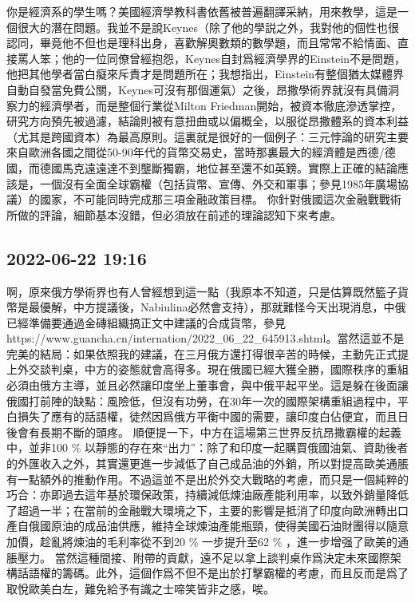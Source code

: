 \documentclass[twocolumn]{ctexart}
\begin{document}
你是經濟系的學生嗎？美國經濟學教科書依舊被普遍翻譯采納，用來教學，這是一個很大的潛在問題。我並不是說Keynes（除了他的學説之外，我對他的個性也很認同，畢竟他不但也是理科出身，喜歡解奧數類的數學題，而且常常不給情面、直接罵人笨；他的一位同僚曾經抱怨，Keynes自封爲經濟學界的Einstein不是問題，他把其他學者當白癡來斥責才是問題所在；我想指出，Einstein有整個猶太媒體界自動自發當免費公關，Keynes可沒有那個運氣）之後，昂撒學術界就沒有具備洞察力的經濟學者，而是整個行業從Milton Friedman開始，被資本徹底滲透掌控，研究方向預先被過濾，結論則被有意扭曲或以偏概全，以服從昂撒體系的資本利益（尤其是跨國資本）為最高原則。這裏就是很好的一個例子：三元悖論的研究主要來自歐洲各國之間從50-90年代的貨幣交易史，當時那裏最大的經濟體是西德/德國，而德國馬克遠遠達不到壟斷獨霸，地位甚至還不如英鎊。實際上正確的結論應該是，一個沒有全面全球霸權（包括貨幣、宣傳、外交和軍事；參見1985年廣場協議）的國家，不可能同時完成那三項金融政策目標。
你針對俄國這次金融戰戰術所做的評論，細節基本沒錯，但必須放在前述的理論認知下來考慮。
\subsection*{2022-06-22 19:16}

啊，原來俄方學術界也有人曾經想到這一點（我原本不知道，只是估算既然籃子貨幣是最優解，中方提議後，Nabiulina必然會支持），那就難怪今天出現消息，中俄已經準備要通過金磚組織搞正文中建議的合成貨幣，參見https://www.guancha.cn/internation/2022\_06\_22\_645913.shtml。當然這並不是完美的結局：如果依照我的建議，在三月俄方還打得很辛苦的時候，主動先正式提上外交談判桌，中方的姿態就會高得多。現在俄國已經大獲全勝，國際秩序的重組必須由俄方主導，並且必然讓印度坐上董事會，與中俄平起平坐。這是躲在後面讓俄國打前陣的缺點：風險低，但沒有功勞，在30年一次的國際架構重組過程中，平白損失了應有的話語權，徒然因爲俄方平衡中國的需要，讓印度白佔便宜，而且日後會有長期不斷的頭疼。
順便提一下，中方在這場第三世界反抗昂撒霸權的起義中，並非100 \% 以靜態的存在來“出力”：除了和印度一起購買俄國油氣、資助後者的外匯收入之外，其實還更進一步減低了自己成品油的外銷，所以對提高歐美通脹有一點額外的推動作用。不過這並不是出於外交大戰略的考慮，而只是一個純粹的巧合：亦即過去這年基於環保政策，持續減低煉油廠產能利用率，以致外銷量降低了超過一半；在當前的金融戰大環境之下，主要的影響是抵消了印度向歐洲轉出口產自俄國原油的成品油供應，維持全球煉油產能瓶頸，使得美國石油財團得以隨意加價，趁亂將煉油的毛利率從不到20 \% 一步提升至62 \% ，進一步增强了歐美的通脹壓力。
當然這種間接、附帶的貢獻，遠不足以拿上談判桌作爲決定未來國際架構話語權的籌碼。此外，這個作爲不但不是出於打擊霸權的考慮，而且反而是爲了取悅歐美白左，難免給予有識之士啼笑皆非之感，唉。
\end{document}
